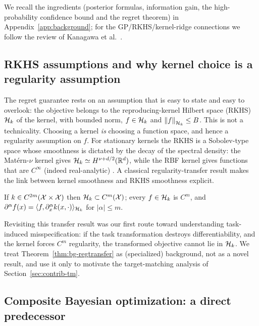 We recall the ingredients (posterior formulas, information gain, the
high-probability confidence bound and the regret theorem) in
Appendix~\ref{app:background}; for the GP/RKHS/kernel-ridge connections we follow
the review of Kanagawa et al.~\cite{kanagawa2018}. \hfill\Plit

\subsection{RKHS assumptions and why kernel choice is a regularity assumption}
\label{sec:bg-rkhs}

The regret guarantee rests on an assumption that is easy to state and easy to
overlook: the objective belongs to the reproducing-kernel Hilbert space (RKHS)
$\mathcal{H}_k$ of the kernel, with bounded norm, $f\in\mathcal{H}_k$ and $\left\lVert f\right\rVert_{\mathcal{H}_k}\le B$. This is
not a technicality. Choosing a kernel \emph{is} choosing a function space, and
hence a regularity assumption on $f$. For stationary kernels the RKHS is a
Sobolev-type space whose smoothness is dictated by the decay of the spectral
density: the Mat\'ern-$\nu$ kernel gives $\mathcal{H}_k\simeq H^{\nu+d/2}(\mathbb{R}^d)$, while the
RBF kernel gives functions that are $C^\infty$ (indeed real-analytic)
\cite{kanagawa2018}. A classical regularity-transfer result makes the link
between kernel smoothness and RKHS smoothness explicit.

\begin{theorem}
\label{thm:bg-regtransfer}
If $k\in C^{2m}(\mathcal{X}\times\mathcal{X})$ then $\mathcal{H}_k\subset C^m(\mathcal{X})$; every $f\in\mathcal{H}_k$ is
$C^m$, and $\partial^\alpha f(x)=\langle f, \partial_x^\alpha k(x,\cdot)\rangle_{\mathcal{H}_k}$
for $|\alpha|\le m$.
\end{theorem}

\noindent Revisiting this transfer result was our first route toward
understanding task-induced misspecification: if the task transformation destroys
differentiability, and the kernel forces $C^m$ regularity, the transformed
objective cannot lie in $\mathcal{H}_k$. We treat Theorem~\ref{thm:bg-regtransfer} as
(specialized) background, not as a novel result, and use it only to motivate the
target-matching analysis of Section~\ref{sec:contrib-tm}.

\subsection{Composite Bayesian optimization: a direct predecessor}
\label{sec:bg-composite}

